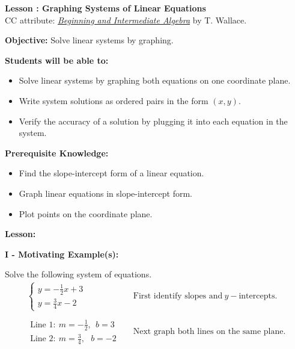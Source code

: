 \documentclass[12pt]{article}
\theoremstyle{definition}
\begin{document}
{\bf \large Lesson : Graphing Systems of Linear Equations}\\
CC attribute: \href{http://www.wallace.ccfaculty.org/book/book.html}{\it{Beginning and Intermediate Algebra}} by T. Wallace. \hfill \doclicenseImage[imagewidth=5em]\\
\par
{\bf Objective:} Solve linear systems by graphing.\\
\par
{\bf Students will be able to:}
\begin{itemize}
	\item Solve linear systems by graphing both equations on one coordinate plane.
	\item Write system solutions as ordered pairs in the form $(x,y)$.
	\item Verify the accuracy of a solution by plugging it into each equation in the system.
\end{itemize}
{\bf Prerequisite Knowledge:}
\begin{itemize}
	\item Find the slope-intercept form of a linear equation.
	\item Graph linear equations in slope-intercept form.
	\item Plot points on the coordinate plane.
\end{itemize}
\hrulefill

{\bf Lesson:}
\par
{\bf I - Motivating Example(s):}\\
\par
Solve the following system of equations.
  \begin{eqnarray*}
 	\begin{cases} 
     y = - \frac{1}{2} x + 3\\
    	y = \frac{3}{4} x - 2
  		\end{cases}
&  & \text{First identify slopes and} \ y- \text{intercepts.}\\
  & & \\ 
	\begin{array}{l}
      \text{Line 1} : \ m = - \frac{1}{2}, \ \ b = 3\\
      \text{Line 2} : \ m = \frac{3}{4}, \ \ \ b = - 2
    \end{array} &  & \text{Next graph both lines on the same plane.}\\
  \end{eqnarray*}
  
\end{document}
